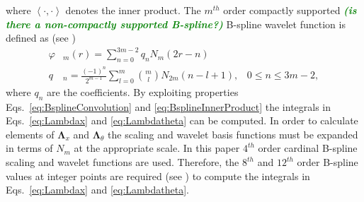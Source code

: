 \documentclass[journal,a4paper]{IEEEtran}
\newcommand{\dean}[1]{\textsf{\emph{\textbf{\textcolor{green}{#1}}}}}
\begin{document}
where $\left\langle \cdot,\cdot\right\rangle $ denotes the inner product. The $m^{th}$ order compactly supported \dean{(is there a non-compactly supported B-spline?)} B-spline wavelet function is defined as (see \cite{Chui1992}) 
\begin{align}
 \varphi & _{m}\left(r\right) = \sum_{n=0}^{3m-2} q_n N_{m}\left(2r-n\right) \\
 q & _n = \frac{\left(-1\right)^n}{2^{m-1}} \sum_{l=0}^{m} \binom{m}{l} N_{2m}\left(n-l+1\right), \,  \text{ $0\le n\le 3m-2$},
\end{align}
where $q_n$ are the coefficients. By exploiting properties Eqs.~\ref{eq:BsplineConvolution} and \ref{eq:BsplineInnerProduct} the integrals in Eqs.~\ref{eq:Lambdax} and \ref{eq:Lambdatheta} can be computed. In order to calculate elements of $\boldsymbol\Lambda_{x}$ and $\boldsymbol\Lambda_{\theta}$ the scaling and wavelet basis functions must be expanded in terms of $N_m$ at the appropriate scale.  In this paper $4^{th}$ order cardinal B-spline scaling and wavelet functions are used. Therefore, the $8^{th}$ and $12^{th}$ order B-spline values at integer points are required (see \cite{Goswami1999}) to compute the integrals in Eqs.~\ref{eq:Lambdax} and \ref{eq:Lambdatheta}.
\end{document}
